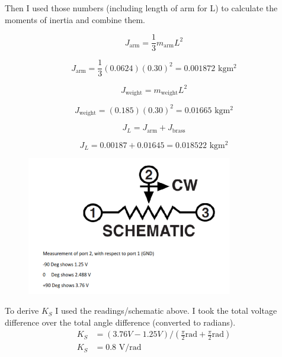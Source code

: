 \documentclass{article}
\begin{document}
Then I used those numbers (including length of arm for L) to calculate the moments of inertia and combine them.

\begin{equation}
    J_{\text{arm}} = \frac{1}{3} m_{\text{arm}} L^2
\end{equation}

\begin{equation}
    J_{\text{arm}} = \frac{1}{3} (0.0624) (0.30)^2 = 0.001872 \text{ kg}\text{m}^2
\end{equation}

\begin{equation}
    J_{\text{weight}} = m_{\text{weight}} L^2
\end{equation}

\begin{equation}
    J_{\text{weight}} = (0.185) (0.30)^2 = 0.01665 \text{ kg}\text{m}^2
\end{equation}

\begin{equation}
    J_L = J_{\text{arm}} + J_{\text{brass}}
\end{equation}

\begin{equation}
    J_L = 0.00187 + 0.01645 = 0.018522 \text{ kg}\text{m}^2
\end{equation}

\begin{figure}[H]
    \centering
    \includegraphics[width=0.8\textwidth]{potentiometerSpec.png}
\end{figure}

To derive $K_S$ I used the readings/schematic above.
I took the total voltage difference over the total angle difference (converted to radians).
\begin{align}
    K_S&=(3.76V-1.25V)/(\frac{\pi}{2}\text{rad}+\frac{\pi}{2}\text{rad}) \\
    K_S&=0.8\text{ V/rad}
\end{align}
\end{document}
